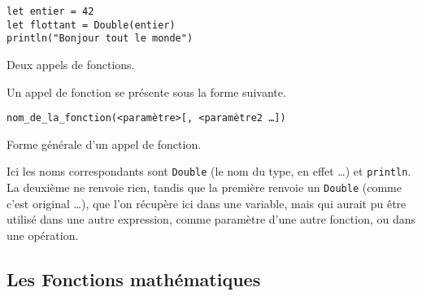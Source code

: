 \begin{listing}[h]
\begin{verbatim}
let entier = 42
let flottant = Double(entier)
println("Bonjour tout le monde")
\end{verbatim}
\caption{Deux appels de fonctions.}
\end{listing}

Un appel de fonction se présente sous la forme suivante.
\begin{listing}[h]
\begin{verbatim}
nom_de_la_fonction(<paramètre>[, <paramètre2 …]) 
\end{verbatim}
\caption{Forme générale d'un appel de fonction.}
\end{listing}

Ici les noms correspondants sont \texttt{Double} (le nom du type, en effet …) et \texttt{println}. La deuxième ne renvoie rien, tandis que la première renvoie un \texttt{Double} (comme c'est original …), que l'on récupère ici dans une variable, mais qui aurait pu être utilisé dans une autre expression, comme paramètre d'une autre fonction, ou dans une opération.

\subsection{Les Fonctions mathématiques}

